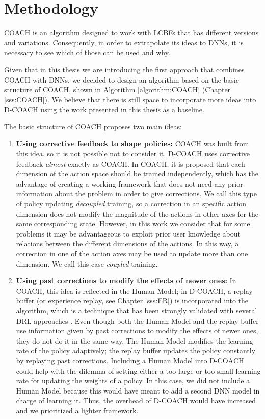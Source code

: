 \section{Methodology}
COACH is an algorithm designed to work with LCBFs that has different versions and variations. Consequently, in order to extrapolate its ideas to DNNs, it is necessary to see which of those can be used and why.

Given that in this thesis we are introducing the first approach that combines COACH with DNNs, we decided to design an algorithm based on the basic structure of COACH, shown in Algorithm \ref{algorithm:COACH} (Chapter \ref{sss:COACH}). We believe that there is still space to incorporate more ideas into D-COACH using the work presented in this thesis as a baseline.

The basic structure of COACH proposes two main ideas:

\begin{enumerate}
    \item \textbf{Using corrective feedback to shape policies:} COACH was built from this idea, so it is not possible not to consider it. D-COACH uses corrective feedback \emph{almost} exactly as COACH. In COACH, it is proposed that each dimension of the action space should be trained independently, which has the advantage of creating a working framework that does not need any prior information about the problem in order to give corrections. We call this type of policy updating \emph{decoupled} training, so a correction in an specific action dimension does not modify the magnitude of the actions in other axes for the same corresponding state. However, in this work we consider that for some problems it may be advantageous to exploit prior user knowledge about relations between the different dimensions of the actions. In this way, a correction in one of the action axes may be used to update more than one dimension. We call this case \emph{coupled} training.
    
    \item \textbf{Using past corrections to modify the effects of newer ones:} In COACH, this idea is reflected in the Human Model; in D-COACH, a replay buffer (or experience replay, see Chapter \ref{sss:ER}) is incorporated into the algorithm, which is a technique that has been strongly validated with several DRL approaches \cite{atari, haarnoja2018soft, Lillicrap2015}. Even though both the Human Model and the replay buffer use information given by past corrections to modify the effects of newer ones, they do not do it in the same way. The Human Model modifies the learning rate of the policy adaptively; the replay buffer updates the policy constantly by replaying past corrections. Including a Human Model into $\text{D-COACH}$ could help with the dilemma of setting either a too large or too small learning rate for updating the weights of a policy. In this case, we did not include a Human Model because this would have meant to add a second DNN model in charge of learning it. Thus, the overhead of D-COACH would have increased and we prioritized a lighter framework.
\end{enumerate}


